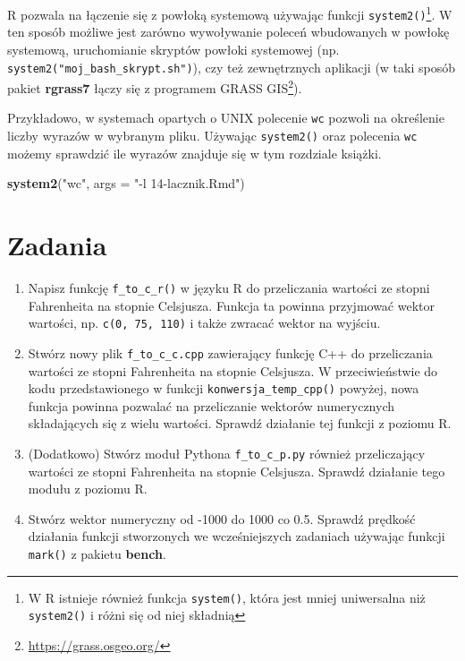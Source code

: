 \documentclass[paper=6in:9in,pagesize=pdftex,headinclude=on,footinclude=on,10pt]{scrbook}
\newenvironment{Shaded}{\begin{snugshade}}{\end{snugshade}}
\newcommand{\DataTypeTok}[1]{\textcolor[rgb]{0.13,0.29,0.53}{#1}}
\newcommand{\KeywordTok}[1]{\textcolor[rgb]{0.13,0.29,0.53}{\textbf{#1}}}
\newcommand{\NormalTok}[1]{#1}
\newcommand{\StringTok}[1]{\textcolor[rgb]{0.31,0.60,0.02}{#1}}
\DeclareRobustCommand{\href}[2]{#2\footnote{\url{#1}}}
\providecommand{\tightlist}{%
  \setlength{\itemsep}{0pt}\setlength{\parskip}{0pt}}
\begin{document}
R pozwala na łączenie się z powłoką systemową używając funkcji \texttt{system2()}\footnote{W R istnieje również funkcja \texttt{system()}, która jest mniej uniwersalna niż \texttt{system2()} i różni się od niej składnią}.
W ten sposób możliwe jest zarówno wywoływanie poleceń wbudowanych w powłokę systemową, uruchomianie skryptów powłoki systemowej (np. \texttt{system2("moj\_bash\_skrypt.sh")}), czy też zewnętrznych aplikacji (w taki sposób pakiet \textbf{rgrass7} \citep{R-rgrass7} łączy się z programem \href{https://grass.osgeo.org/}{GRASS GIS}).

Przykładowo, w systemach opartych o UNIX polecenie \texttt{wc} pozwoli na określenie liczby wyrazów w wybranym pliku.
Używając \texttt{system2()} oraz polecenia \texttt{wc} możemy sprawdzić ile wyrazów znajduje się w tym rozdziale książki.

\begin{Shaded}
\begin{Highlighting}[]
\KeywordTok{system2}\NormalTok{(}\StringTok{"wc"}\NormalTok{, }\DataTypeTok{args =} \StringTok{"-l 14-lacznik.Rmd"}\NormalTok{)}
\end{Highlighting}
\end{Shaded}

\hypertarget{zadania-12}{%
\section{Zadania}\label{zadania-12}}

\begin{enumerate}
\def\labelenumi{\arabic{enumi}.}
\tightlist
\item
  Napisz funkcję \texttt{f\_to\_c\_r()} w języku R do przeliczania wartości ze stopni Fahrenheita na stopnie Celsjusza.
  Funkcja ta powinna przyjmować wektor wartości, np. \texttt{c(0,\ 75,\ 110)} i także zwracać wektor na wyjściu.
\item
  Stwórz nowy plik \texttt{f\_to\_c\_c.cpp} zawierający funkcję C++ do przeliczania wartości ze stopni Fahrenheita na stopnie Celsjusza.
  W przeciwieństwie do kodu przedstawionego w funkcji \texttt{konwersja\_temp\_cpp()} powyżej, nowa funkcja powinna pozwalać na przeliczanie wektorów numerycznych składających się z wielu wartości.
  Sprawdź działanie tej funkcji z poziomu R.
\item
  (Dodatkowo) Stwórz moduł Pythona \texttt{f\_to\_c\_p.py} również przeliczający wartości ze stopni Fahrenheita na stopnie Celsjusza.
  Sprawdź działanie tego modułu z poziomu R.
\item
  Stwórz wektor numeryczny od -1000 do 1000 co 0.5.
  Sprawdź prędkość działania funkcji stworzonych we wcześniejszych zadaniach używając funkcji \texttt{mark()} z pakietu \textbf{bench}.
\end{enumerate}
\end{document}
